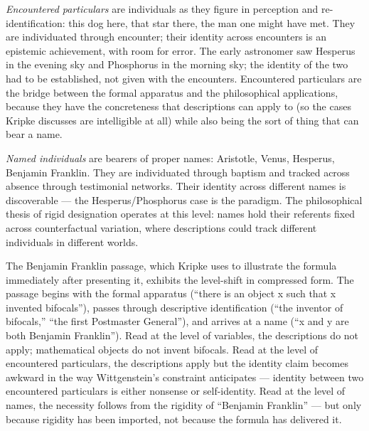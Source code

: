 \documentclass[10pt]{article}
\begin{document}
\emph{Encountered particulars} are individuals as they figure in perception and re-identification: this dog here, that star there, the man one might have met. They are individuated through encounter; their identity across encounters is an epistemic achievement, with room for error. The early astronomer saw Hesperus in the evening sky and Phosphorus in the morning sky; the identity of the two had to be established, not given with the encounters. Encountered particulars are the bridge between the formal apparatus and the philosophical applications, because they have the concreteness that descriptions can apply to (so the cases Kripke discusses are intelligible at all) while also being the sort of thing that can bear a name.

\emph{Named individuals} are bearers of proper names: Aristotle, Venus, Hesperus, Benjamin Franklin. They are individuated through baptism and tracked across absence through testimonial networks. Their identity across different names is discoverable --- the Hesperus/Phosphorus case is the paradigm. The philosophical thesis of rigid designation operates at this level: names hold their referents fixed across counterfactual variation, where descriptions could track different individuals in different worlds.

The Benjamin Franklin passage, which Kripke uses to illustrate the formula immediately after presenting it, exhibits the level-shift in compressed form. The passage begins with the formal apparatus (``there is an object x such that x invented bifocals''), passes through descriptive identification (``the inventor of bifocals,'' ``the first Postmaster General''), and arrives at a name (``x and y are both Benjamin Franklin''). Read at the level of variables, the descriptions do not apply; mathematical objects do not invent bifocals. Read at the level of encountered particulars, the descriptions apply but the identity claim becomes awkward in the way Wittgenstein's constraint anticipates --- identity between two encountered particulars is either nonsense or self-identity. Read at the level of names, the necessity follows from the rigidity of ``Benjamin Franklin'' --- but only because rigidity has been imported, not because the formula has delivered it.
\end{document}
